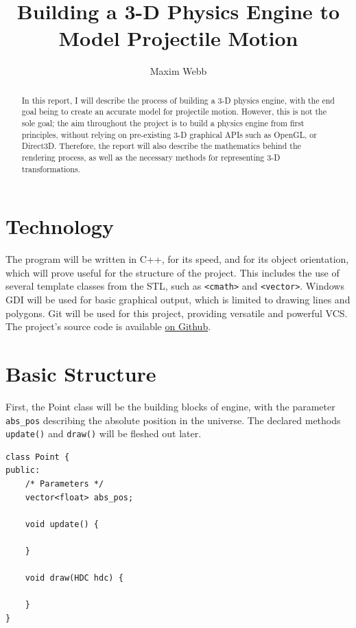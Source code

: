\documentclass{article}
\title{
	\Huge
	{Building a 3-D Physics Engine to Model Projectile Motion}\\
}
\author{Maxim Webb}
\begin{document}
\maketitle

\newpage

\begin{abstract}
In this report, I will describe the process of building a 3-D physics engine, with the end goal being to create an accurate model for projectile motion.
\newline
\newline
However, this is not the sole goal; the aim throughout the project is to build a physics engine from first principles, without relying on pre-existing 3-D graphical APIs such as OpenGL, or Direct3D. Therefore, the report will also describe the mathematics behind the rendering process, as well as the necessary methods for representing 3-D transformations.
\newline
\end{abstract}
\newpage
\tableofcontents

\newpage

\section{Technology}
The program will be written in C++, for its speed, and for its object orientation, which will prove useful for the structure of the project. This includes the use of several template classes from the STL, such as \verb|<cmath>| and \verb|<vector>|.
\newline
\newline
Windows GDI will be used for basic graphical output, which is limited to drawing lines and polygons. 
\newline
\newline
Git will be used for this project, providing versatile and powerful VCS. The project's source code is available 
\href{https://github.com/maximwebb/3D-engine}{\color{blue} on Github}\color{black}.

\newpage
\section{Basic Structure}

First, the Point class will be the building blocks of engine, with the parameter \verb|abs_pos| describing the absolute position in the universe. The declared methods \verb|update()| and \verb|draw()| will be fleshed out later.
\begin{lstlisting}
class Point {
public:
	/* Parameters */
	vector<float> abs_pos;
	
	void update() {
	
	}
	
	void draw(HDC hdc) {
	
	}
}
\end{lstlisting}
\end{document}
